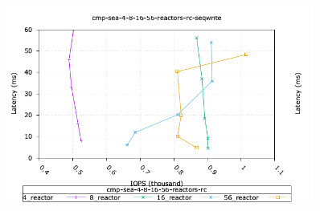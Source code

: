 \begin{figure}[ht]
  \centering
  \includegraphics[width=0.9\textwidth]{cmp_sea_4_8_16_56_reactors_rc_seqwrite_iops_vs_lat.png}
\end{figure}

%


